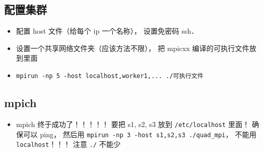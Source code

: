 \subsection{配置集群}
\begin{itemize}
\item 配置 host 文件（给每个 ip 一个名称）， 设置免密码 ssh．
\item 设置一个共享网络文件夹（应该方法不限）， 把 mpicxx 编译的可执行文件放到里面
\item \verb|mpirun -np 5 -host localhost,worker1,... ./可执行文件|
\end{itemize}


\subsection{mpich}
\begin{itemize}
\item mpich 终于成功了！！！！！ 要把 s1, s2, s3 放到 \verb|/etc/localhost| 里面！ 确保可以 ping， 然后用 \verb|mpirun -np 3 -host s1,s2,s3 ./quad_mpi|， 不能用 \verb|localhost|！！！ 注意 \verb|./| 不能少
\end{itemize}

